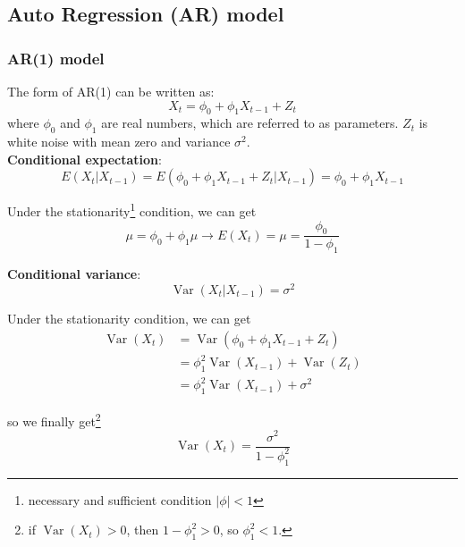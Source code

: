 \documentclass{article}
\begin{document}
\subsection{Auto Regression (AR) model}
\subsubsection{AR(1) model}
The form of AR(1) can be written as:
\begin{equation}\label{AR1}
X_{t}=\phi_{0}+\phi_{1} X_{t-1}+Z_{t}
\end{equation}
\noindent where $\phi_0$ and $\phi_1$ are real numbers, which are referred to as parameters. $Z_t$ is white noise with mean zero and variance $\sigma^2$. \\

\noindent \textbf{Conditional expectation}:
\begin{equation*}
E\left(X_{t} | X_{t-1}\right)=E\left(\phi_{0}+\phi_{1} X_{t-1}+Z_{t} | X_{t-1}\right)=\phi_{0}+\phi_{1} X_{t-1}
\end{equation*}

\noindent Under the stationarity\footnote{necessary and sufficient condition $|\phi| < 1$} condition, we can get
\begin{equation*}
\mu = \phi_0 + \phi_1\mu \longrightarrow E\left(X_{t}\right) = \mu = \frac{\phi_0}{1-\phi_1}
\end{equation*}

\noindent \textbf{Conditional variance}:
\begin{equation*}
\operatorname{Var}\left(X_{t} | X_{t-1}\right)=\sigma^{2}
\end{equation*}

\noindent Under the stationarity condition, we can get
\begin{equation*}
\begin{array}{ll} {\operatorname{Var}\left(X_{t}\right) } & ={\operatorname{Var}\left(\phi_0 + \phi_1X_{t-1} + Z_t\right)} \\ & ={\phi_1^2 \operatorname{Var}\left(X_{t-1}\right) + \operatorname{Var}\left(Z_{t}\right)} \\ & ={\phi_1^2 \operatorname{Var}\left(X_{t-1}\right) + \sigma^2}
\end{array}
\end{equation*}

\noindent so we finally get\footnote{if $\operatorname{Var}\left(X_{t}\right) > 0$, then $1 - \phi_1^2 > 0$, so $\phi_1^2 < 1$.}
\begin{equation*}
\operatorname{Var}\left(X_{t}\right) = \frac{\sigma^2}{1 - \phi_1^2}
\end{equation*}
\end{document}
